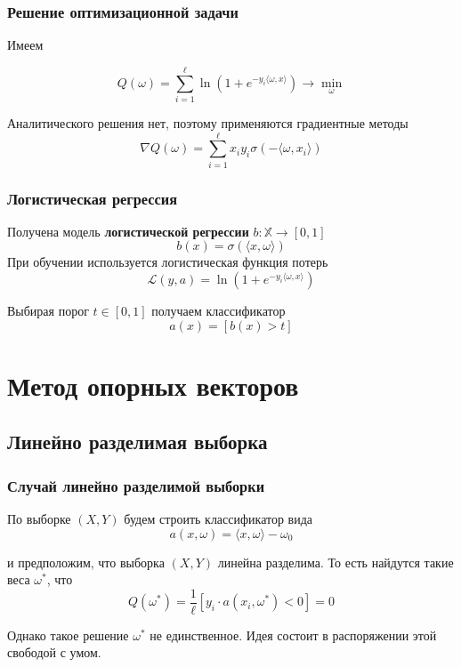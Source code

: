\documentclass{beamer}
\begin{document}
	\begin{frame}
		\frametitle{Решение оптимизационной задачи}
		Имеем
		
		\[
		Q(\omega) = \sum_{i=1}^{\ell} \ln (1 + e^{- y_i \langle \omega, x \rangle}) \rightarrow \min_{\omega}
		\]
		
		Аналитического решения нет, поэтому применяются градиентные методы
		\[
		\nabla Q(\omega) = \sum_{i=1}^{\ell} x_i y_i \sigma(- \langle \omega, x_i \rangle)
		\]
	\end{frame}
	
	\begin{frame}
		\frametitle{Логистическая регрессия}
		Получена модель \textbf{логистической регрессии} $b: \mathbb{X} \rightarrow [0, 1]$
		\[
		b(x) = \sigma(\langle x, \omega \rangle)
		\]
		При обучении используется логистическая функция потерь
		\[
		\mathcal{L}(y, a) = \ln(1 + e^{-y_i \langle \omega, x \rangle})
		\]
		
		Выбирая порог $t \in [0, 1]$ получаем классификатор
		\[
		a(x) = [b(x) > t]
		\]
		
	\end{frame}
	
	\section{Метод опорных векторов}
	
	\subsection{Линейно разделимая выборка}
	
	\begin{frame}
		\frametitle{Случай линейно разделимой выборки}
		
		По выборке $(X, Y)$ будем строить классификатор вида
		\[
		a(x, \omega) = \langle x, \omega \rangle - \omega_0
		\]
		
		и предположим, что выборка $(X, Y)$ линейна разделима. То есть найдутся такие веса $\omega^{*}$, что 
		\[
		Q(\omega^{*}) = \frac{1}{\ell} [y_i \cdot a(x_i, \omega^{*}) < 0] = 0
		\]
		
		Однако такое решение $\omega^{*}$ не единственное. Идея состоит в распоряжении этой свободой с умом.
	\end{frame}
	
\end{document}
